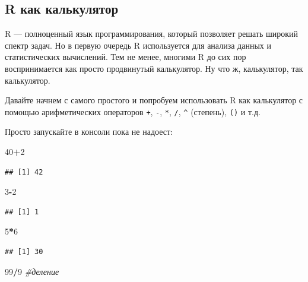 \documentclass[]{book}
\newenvironment{Shaded}{\begin{snugshade}}{\end{snugshade}}
\newcommand{\DecValTok}[1]{\textcolor[rgb]{0.00,0.00,0.81}{#1}}
\newcommand{\CommentTok}[1]{\textcolor[rgb]{0.56,0.35,0.01}{\textit{#1}}}
\newcommand{\OperatorTok}[1]{\textcolor[rgb]{0.81,0.36,0.00}{\textbf{#1}}}
\begin{document}
\subsection{R как калькулятор}\label{calc}

R --- полноценный язык программирования, который позволяет решать
широкий спектр задач. Но в первую очередь R используется для анализа
данных и статистических вычислений. Тем не менее, многими R до сих пор
воспринимается как просто продвинутый калькулятор. Ну что ж,
калькулятор, так калькулятор.

Давайте начнем с самого простого и попробуем использовать R как
калькулятор с помощью арифметических операторов \texttt{+}, \texttt{-},
\texttt{*}, \texttt{/}, \texttt{\^{}} (степень), \texttt{()} и т.д.

Просто запускайте в консоли пока не надоест:

\begin{Shaded}
\begin{Highlighting}[]
\DecValTok{40}\OperatorTok{+}\DecValTok{2}
\end{Highlighting}
\end{Shaded}

\begin{verbatim}
## [1] 42
\end{verbatim}

\begin{Shaded}
\begin{Highlighting}[]
\DecValTok{3}\OperatorTok{-}\DecValTok{2}
\end{Highlighting}
\end{Shaded}

\begin{verbatim}
## [1] 1
\end{verbatim}

\begin{Shaded}
\begin{Highlighting}[]
\DecValTok{5}\OperatorTok{*}\DecValTok{6}
\end{Highlighting}
\end{Shaded}

\begin{verbatim}
## [1] 30
\end{verbatim}

\begin{Shaded}
\begin{Highlighting}[]
\DecValTok{99}\OperatorTok{/}\DecValTok{9} \CommentTok{#деление}
\end{Highlighting}
\end{Shaded}
\end{document}
